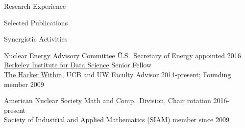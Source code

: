 \documentclass{resume3} %
\begin{document}
\begin{rSection}{Research Experience}
%

\end{rSection}

\begin{rSection}{Selected Publications}

\end{rSection}

\vspace*{0.5em}
\begin{rSection}{Synergistic Activities}
\begin{tabbing}
\= Nuclear Energy Advisory Committee \hspace*{3em} \= U.S.\ Secretary of Energy appointed 2016\\
%
\>\href{http://bids.berkeley.edu/}{Berkeley Institute for Data Science} \> Senior Fellow\\
%
\> \href{http://thehackerwithin.github.io/berkeley/}{The Hacker Within}, UCB and UW  \> Faculty Advisor 2014-present; Founding member 2009%
%
%
\end{tabbing}
\vspace*{-.5em}
American Nuclear Society Math and Comp.\ Division, Chair rotation 2016-present\\
Society of Industrial and Applied Mathematics (SIAM) member since 2009 
\end{rSection}
\vspace*{-.5em}
\end{document}
